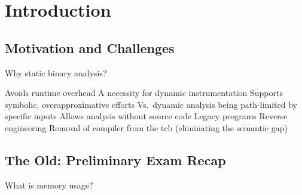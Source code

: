 \section{Introduction}

\subsection{Motivation and Challenges}
\begin{frame}{Why static binary analysis?}
  \begin{outline}
    \1 Avoids \alert{runtime overhead}
    \2 A necessity for dynamic instrumentation
    \1 Supports symbolic, \alert{overapproximative} efforts
    \2 Vs.\ dynamic analysis being path-limited by specific inputs
    \1 Allows analysis without source code
    \2 Legacy programs
    \2 Reverse engineering
    \2 Removal of compiler from the \gls{tcb} (eliminating the \alert{semantic gap})
  \end{outline}

\end{frame}


\subsection{The Old: Preliminary Exam Recap}
\begin{frame}{What is memory usage?}
\end{frame}

\begin{comment} %
  \begin{frame}{Memory Usage is an \emph{Overapproximation}}
    \centering
    \begin{tikzpicture}[region/.style={circle, fill=red, text=white}]
      \node[ellipse, fill=green, text width=4.5cm, text height=2cm] {};
      \node[region] at (2, .75) {$r_0$};
      \node[region] at (1.6, 0) {$r_1$};
      \node[region] at (0.7, -0.5) {$r_2$};
      \node<-3>[region] at (0, 0.1) {$r_3$};
      \node<-2>[region] at (-1, -0.9) {$r_4$};
      \node<1>[region] at (-1.7, 0.5) {$r_5$};
    \end{tikzpicture}
    \vfill
    \begin{tabular}{rr}
      \textcolor{blue}{Green} & proof of no change \\
      \textcolor{blue}{Red} & no proof of no change
    \end{tabular}
  \end{frame}
\end{comment}

